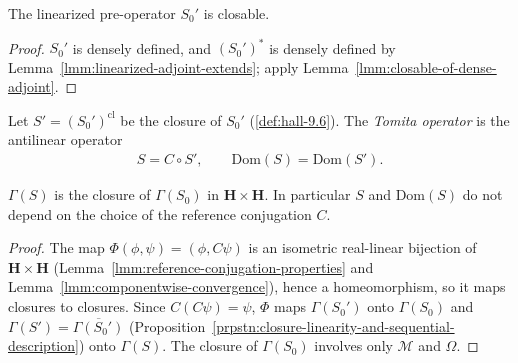 \begin{corollary}[$S_0'$ is Closable]
    \label{crllr:linearized-tomita-closable}
    \leanok
    The linearized pre-operator $S_0'$ is closable.
\end{corollary}
\begin{proof}
    \leanok
    $S_0'$ is densely defined, and $(S_0')^*$ is densely defined by Lemma~\ref{lmm:linearized-adjoint-extends}; apply Lemma~\ref{lmm:closable-of-dense-adjoint}.
\end{proof}

\begin{definition}
    \label{def:tomita-operator}
    \leanok
    Let $S' = (S_0')^{\text{cl}}$ be the closure of $S_0'$ (\ref{def:hall-9.6}). The \emph{Tomita operator} is the antilinear operator
    \begin{align}
        S = C \circ S', \qquad \text{Dom}(S) = \text{Dom}(S').
    \end{align}
\end{definition}

\begin{lemma}
    \label{lmm:tomita-operator-independent-of-c}
    \leanok
    $\Gamma(S)$ is the closure of $\Gamma(S_0)$ in $\mathbf{H} \times \mathbf{H}$. In particular $S$ and $\text{Dom}(S)$ do not depend on the choice of the reference conjugation $C$.
\end{lemma}
\begin{proof}
    \leanok
    The map $\Phi(\phi, \psi) = (\phi, C\psi)$ is an isometric real-linear bijection of $\mathbf{H} \times \mathbf{H}$ (Lemma~\ref{lmm:reference-conjugation-properties} and Lemma~\ref{lmm:componentwise-convergence}), hence a homeomorphism, so it maps closures to closures. Since $C(C\psi) = \psi$, $\Phi$ maps $\Gamma(S_0')$ onto $\Gamma(S_0)$ and $\Gamma(S') = \overline{\Gamma(S_0')}$ (Proposition~\ref{prpstn:closure-linearity-and-sequential-description}) onto $\Gamma(S)$. The closure of $\Gamma(S_0)$ involves only $\mathcal{M}$ and $\Omega$.
\end{proof}

